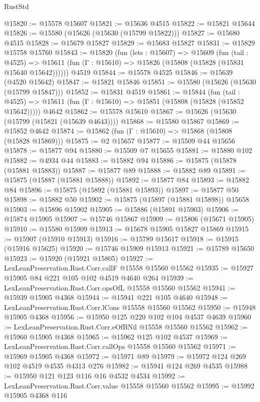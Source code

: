 \begin{lexlean}{RustStd}
\begin{coremodule}
@15820 := @15578 @15607
@15821 := @15636 @4515
@15822 := @15821 @15644
@15826 := @15580 (@15626 (@15630 (@15799 @15822)))
@15827 := @15680 @4515
@15828 := @15679 @15827
@15829 := @15683 @15827
@15831 := @15829 @15758 @15760
@15843 := @15820
    (fun (lets : @15607) =>
    @15609
      (fun (tail : @4525) =>
      @15611 (fun (Γ : @15610) => @15826 (@15808 (@15828 (@15831 @15640 @15642))))))
    @4519
@15844 := @15578 @4525
@15846 := @15639 (@4520 @15642)
@15847 := @15821 @15846
@15851 := @15580 (@15626 (@15630 (@15799 @15847)))
@15852 := @15831 @4519
@15861 := @15844
    (fun (tail : @4525) => @15611 (fun (Γ : @15610) => @15851 (@15808 (@15828 (@15852 @15642)))))
    @4642
@15862 := @15578 @15610
@15867 := @15626 (@15630 (@15799 (@15821 (@15639 @4643))))
@15868 := @15580 @15867
@15869 := @15852 @4642
@15874 := @15862 (fun (Γ : @15610) => @15868 (@15808 (@15828 @15869)))
@15875 := @2 @15657
@15877 := @15509 @44 @15656
@15878 := @15877 @94
@15880 := @15509 @7 @15655
@15881 := @15880 @102
@15882 := @4934 @44
@15883 := @15882 @94
@15886 := @15875 (@15878 (@15881 @15883))
@15887 := @15877 @89
@15888 := @15882 @89
@15891 := @15875 (@15887 (@15881 @15888))
@15892 := @15877 @84
@15893 := @15882 @84
@15896 := @15875 (@15892 (@15881 @15893))
@15897 := @15877 @50
@15898 := @15882 @50
@15902 := @15875 (@15897 (@15881 @15898)) @15658
@15903 := @15896 @15902
@15905 := @15886 (@15891 @15903)
@15906 := @15874 @15905
@15907 := @15746 @15867
@15909 := @15806 (@15671 @15905)
@15910 := @15580 @15909
@15913 := @15678 @15905 @15827 @15869
@15915 := @15907 (@15910 @15913)
@15916 := @15789 @15617
@15918 := @15915 (@15916 @15625)
@15920 := @15746 @15909 @15913
@15921 := @15789 @15650
@15923 := @15920 (@15921 @15805)
@15927 := LexLeanPreservation.Rust.Corr.callF @15558 @15560 @15562
@15935 := @15927 @15905 @84 @221 @105 @102 @4519 @4640 @264
@15939 := LexLeanPreservation.Rust.Corr.opsOfL @15558 @15560 @15562
@15941 := @15939 @15905 @4368
@15944 := @15941 @221 @105 @4640
@15948 := LexLeanPreservation.Rust.Corr.lCons @15558 @15560 @15562
@15950 := @15948 @15905 @4368
@15956 := @15950 @125 @220 @102 @104 @4537 @4639
@15960 := LexLeanPreservation.Rust.Corr.eOfBNil @15558 @15560 @15562
@15962 := @15960 @15905 @4368
@15965 := @15962 @125 @102 @4537
@15969 := LexLeanPreservation.Rust.Corr.callOps @15558 @15560 @15562
@15971 := @15969 @15905 @4368
@15972 := @15971 @89
@15979 := @15972 @124 @269 @102 @4519 @4535 @4313 @276
@15982 := @15941 @124 @269 @4535
@15988 := @15950 @121 @123 @116 @16 @4532 @4534
@15992 := LexLeanPreservation.Rust.Corr.value @15558 @15560 @15562
@15995 := @15992 @15905 @4368 @116

\end{coremodule}
\end{lexlean}
